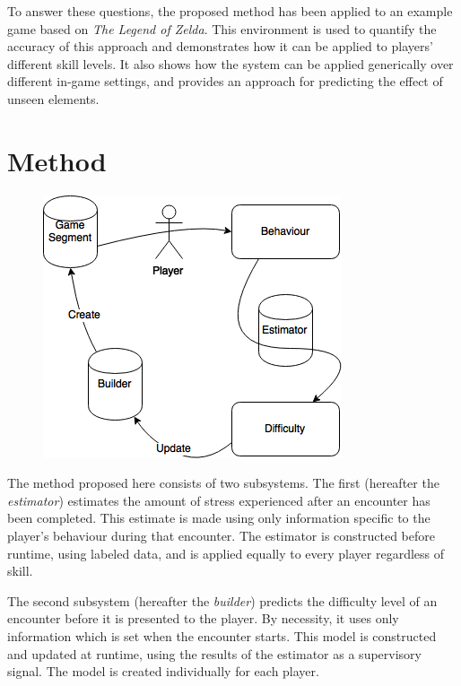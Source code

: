 \documentclass[a4paper]{article}
\begin{document}
\begin{multicols*}{2}
To answer these questions, the proposed method has been applied to an example game based on \emph{The Legend of Zelda}. This environment is used to quantify the accuracy of this approach and demonstrates how it can be applied to players' different skill levels. It also shows how the system can be applied generically over different in-game settings, and provides an approach for predicting the effect of unseen elements.

\section{Method}
\begin{figure}[t]
\centering
\includegraphics[width=\textwidth]{processflowchart}
\end{figure}

The method proposed here consists of two subsystems. The first (hereafter the \emph{estimator}) estimates the amount of stress experienced after an encounter has been completed. This estimate is made using only information specific to the player's behaviour during that encounter. The estimator is constructed before runtime, using labeled data, and is applied equally to every player regardless of skill.

The second subsystem (hereafter the \emph{builder}) predicts the difficulty level of an encounter before it is presented to the player. By necessity, it uses only information which is set when the encounter starts. This model is constructed and updated at runtime, using the results of the estimator as a supervisory signal. The model is created individually for each player.


\end{multicols*}
\end{document}
